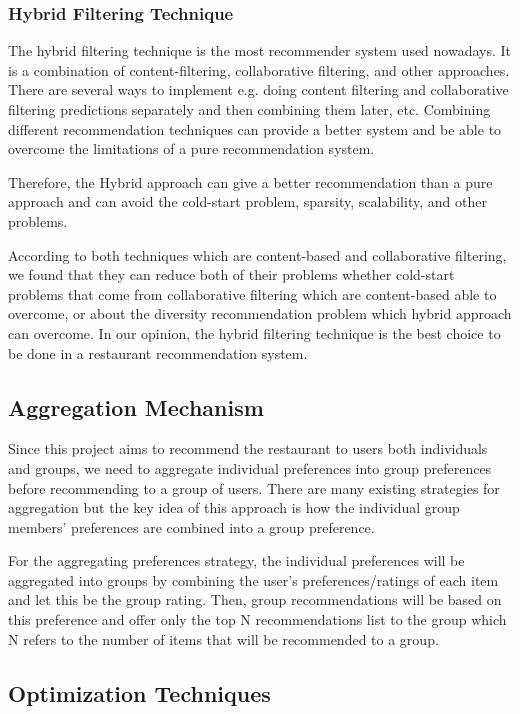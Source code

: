 \documentclass[12pt,oneside,openright,a4paper]{cpe-english-project}
\begin{document}
\subsubsection{Hybrid Filtering Technique}

The hybrid filtering technique is the most recommender system used nowadays. It is a combination of content-filtering, collaborative filtering, and other approaches. There are several ways to implement e.g. doing content filtering and collaborative filtering predictions separately and then combining them later, etc. Combining different recommendation techniques can provide a better system and be able to overcome the limitations of a pure recommendation system.

Therefore, the Hybrid approach can give a better recommendation than a pure approach and can avoid the cold-start problem, sparsity, scalability, and other problems.

According to both techniques which are content-based and collaborative filtering, we found that they can reduce both of their problems whether cold-start problems that come from collaborative filtering which are content-based able to overcome, or about the diversity recommendation problem which hybrid approach can overcome. In our opinion, the hybrid filtering technique is the best choice to be done in a restaurant recommendation system.
        
        

\subsection{Aggregation Mechanism}

Since this project aims to recommend the restaurant to users both individuals and groups, we need to aggregate individual preferences into group preferences before recommending to a group of users. There are many existing strategies for aggregation but the key idea of this approach is how the individual group members’ preferences are combined into a group preference.

For the aggregating preferences strategy, the individual preferences will be aggregated into groups by combining the user’s preferences/ratings of each item and let this be the group rating. Then, group recommendations will be based on this preference and offer only the top N recommendations list to the group which N refers to the number of items that will be recommended to a group.

\subsection{Optimization Techniques}
\end{document}
